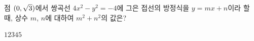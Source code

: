 점 $(0{,}\mkern3mu\mathopen{}\sqrt{3})$에서 쌍곡선 $4x^2-y^2=-4$에 그은 접선의 방정식을 $y=mx+n$이라 할 때, 상수 $m$, $n$에 대하여 $m^2+n^2$의 값은?
\begin{choices32}{$1$}{$2$}{$3$}{$4$}{$5$}\end{choices32}
